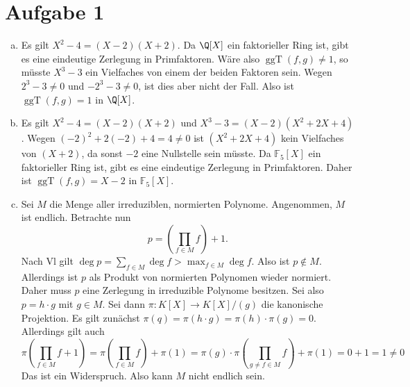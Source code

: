 \documentclass{article}
\newcommand{\ggT}{\operatorname{ggT}}
\begin{document}
\def\headheight{25pt}
    \section*{Aufgabe 1}
    \begin{enumerate}[(a)]
        \item Es gilt $X^2 - 4 = (X - 2)(X + 2)$. Da $\Q[X]$ ein faktorieller Ring ist, gibt es eine eindeutige Zerlegung in Primfaktoren. Wäre also $\ggT(f, g) \neq 1$, so müsste $X^3-3$ ein Vielfaches von einem der beiden Faktoren sein. Wegen $2^3 - 3\neq 0$ und $-2^3 -3 \neq 0$, ist dies aber nicht der Fall. Also ist $\ggT(f,g) = 1$ in $\Q[X]$.
        \item Es gilt $X^2 - 4 = (X-2)(X+2)$ und $X^3 - 3 = (X-2)(X^2 + 2X + 4)$. Wegen $(-2)^2 + 2(-2) + 4 = 4 \neq 0$ ist $(X^2 + 2X + 4)$ kein Vielfaches von $(X + 2)$, da sonst $-2$ eine Nullstelle sein müsste. Da $\mathbb{F}_5[X]$ ein faktorieller Ring ist, gibt es eine eindeutige Zerlegung in Primfaktoren. Daher ist $\ggT(f,g) = X-2$ in $\mathbb{F}_5[X]$.
        \item Sei $M$ die Menge aller irreduziblen, normierten Polynome. Angenommen, $M$ ist endlich. Betrachte nun
        \[
            p = \left(\prod_{f\in M} f \right) + 1.
        \]
        Nach Vl gilt $\deg p = \sum_{f \in M} \deg f > \max_{f\in M} \deg f$. Also ist $p \notin M$. Allerdings ist $p$ als Produkt von normierten Polynomen wieder normiert. Daher muss $p$ eine Zerlegung in irreduzible Polynome besitzen. Sei also $p = h\cdot g$ mit $g\in M$. Sei dann $\pi\colon K[X] \to K[X]/(g)$ die kanonische Projektion. Es gilt zunächst $\pi(q) = \pi(h \cdot g) = \pi(h)\cdot \pi(g) = 0$. Allerdings gilt auch
        \[
          \pi\left(\prod_{f\in M} f + 1\right) = \pi\left(\prod_{f\in M} f \right) + \pi(1) = \pi(g) \cdot \pi\left(\prod_{g \neq f\in M} f \right) + \pi(1) = 0 + 1 = 1\neq 0
        \]
        Das ist ein Widerspruch. Also kann $M$ nicht endlich sein.

\end{enumerate}
\end{document}
